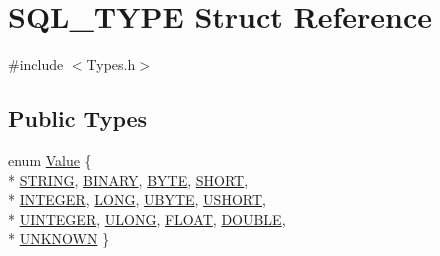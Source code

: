 \hypertarget{struct_s_q_l___t_y_p_e}{}\section{S\+Q\+L\+\_\+\+T\+Y\+P\+E Struct Reference}
\label{struct_s_q_l___t_y_p_e}


{\ttfamily \#include $<$Types.\+h$>$}

\subsection*{Public Types}
\begin{DoxyCompactItemize}
\item 
enum \hyperlink{struct_s_q_l___t_y_p_e_a2ad43c0413d655b655c3b5ca694d1963}{Value} \{ \\*
\hyperlink{struct_s_q_l___t_y_p_e_a2ad43c0413d655b655c3b5ca694d1963ac9434be0745affcbaeb9e4f14f45f164}{S\+T\+R\+I\+N\+G}, 
\hyperlink{struct_s_q_l___t_y_p_e_a2ad43c0413d655b655c3b5ca694d1963a2e6846d2c69f564c179a5eff8571f360}{B\+I\+N\+A\+R\+Y}, 
\hyperlink{struct_s_q_l___t_y_p_e_a2ad43c0413d655b655c3b5ca694d1963a27d4e5cf86f964c91d04e3d65ca181b6}{B\+Y\+T\+E}, 
\hyperlink{struct_s_q_l___t_y_p_e_a2ad43c0413d655b655c3b5ca694d1963abd99b57530150a2f83e3f17ca9047910}{S\+H\+O\+R\+T}, 
\\*
\hyperlink{struct_s_q_l___t_y_p_e_a2ad43c0413d655b655c3b5ca694d1963a74ba3f11fb87176b8ef5f03f54a0dd6b}{I\+N\+T\+E\+G\+E\+R}, 
\hyperlink{struct_s_q_l___t_y_p_e_a2ad43c0413d655b655c3b5ca694d1963aa9de387473db2da347941ee443ee85d8}{L\+O\+N\+G}, 
\hyperlink{struct_s_q_l___t_y_p_e_a2ad43c0413d655b655c3b5ca694d1963a5c1c2f589ea4b0dddd967a3e9c67896e}{U\+B\+Y\+T\+E}, 
\hyperlink{struct_s_q_l___t_y_p_e_a2ad43c0413d655b655c3b5ca694d1963ab47e82a32db6bad5df96c74b43d2217c}{U\+S\+H\+O\+R\+T}, 
\\*
\hyperlink{struct_s_q_l___t_y_p_e_a2ad43c0413d655b655c3b5ca694d1963ab75758e67059a9771c879aca218dd4bb}{U\+I\+N\+T\+E\+G\+E\+R}, 
\hyperlink{struct_s_q_l___t_y_p_e_a2ad43c0413d655b655c3b5ca694d1963a16fc0be5538240cf145c5339af60cc6f}{U\+L\+O\+N\+G}, 
\hyperlink{struct_s_q_l___t_y_p_e_a2ad43c0413d655b655c3b5ca694d1963a2d1d962fdba1b92dad33704120b3f970}{F\+L\+O\+A\+T}, 
\hyperlink{struct_s_q_l___t_y_p_e_a2ad43c0413d655b655c3b5ca694d1963a726041a90124dcaded12020fe26608a8}{D\+O\+U\+B\+L\+E}, 
\\*
\hyperlink{struct_s_q_l___t_y_p_e_a2ad43c0413d655b655c3b5ca694d1963a32d224e0f6a2fb090d061139a99f2a02}{U\+N\+K\+N\+O\+W\+N}
 \}
\end{DoxyCompactItemize}



